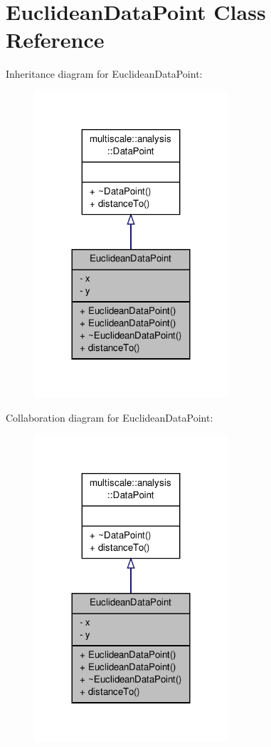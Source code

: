 \hypertarget{classEuclideanDataPoint}{\section{Euclidean\-Data\-Point Class Reference}
\label{classEuclideanDataPoint}
}


Inheritance diagram for Euclidean\-Data\-Point\-:\nopagebreak
\begin{figure}[H]
\begin{center}
\leavevmode
\includegraphics[width=204pt]{classEuclideanDataPoint__inherit__graph}
\end{center}
\end{figure}


Collaboration diagram for Euclidean\-Data\-Point\-:\nopagebreak
\begin{figure}[H]
\begin{center}
\leavevmode
\includegraphics[width=204pt]{classEuclideanDataPoint__coll__graph}
\end{center}
\end{figure}
